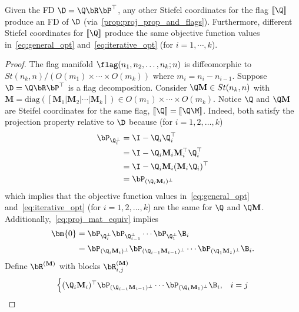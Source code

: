\begin{prop}
    Given the FD $\D = \Q \bR \bP^\top$, any other Stiefel coordinates for the flag $[\![\Q]\!]$ produce an FD of $\D$ (via~\cref{prop:proj_prop_and_flags}). Furthermore, different Stiefel coordinates for $[\![\Q]\!]$ produce the same objective function values in~\cref{eq:general_opt} and~\cref{eq:iterative_opt} (for $i=1,\cdots,k$).
\end{prop}
\begin{proof}
    The flag manifold $\flag(n_1,n_2,\dots,n_k;n)$ is diffeomorphic to $St(n_k,n)/(O(m_1)\times \cdots \times O(m_k))$ where $m_i = n_i - n_{i-1}$. Suppose $\D = \Q \bR \bP^\top$ is a flag decomposition. Consider $\Q \mathbf{M} \in St(n_k,n)$ with $\mathbf{M} = \mathrm{diag}([\mathbf{M}_1|\mathbf{M}_2|\cdots | \mathbf{M}_k]) \in O(m_1)\times \cdots \times O(m_k)$. Notice $\Q$ and $\Q \mathbf{M}$ are Steifel coordinates for the same flag, $[\![\Q]\!]=[\![\Q\M]\!]$. Indeed, both satisfy the projection property relative to $\D$ because (for $i=1,2,\dots,k$)
    \begin{align}\label{eq:proj_mat_equiv}
    \begin{aligned}%
        \bP_{\Q_i^\perp} &= \I - \Q_i \Q_i^\top\\
        &= \I - \Q_i \mathbf{M}_i \mathbf{M}_i^\top\Q_i^\top\\
        &= \I - \Q_i \mathbf{M}_i (\mathbf{M}_i \Q_i)^\top\\
        &= \bP_{(\Q_i\mathbf{M}_i)^\perp}
    \end{aligned}
    \end{align}
    which implies that the objective function values in~\cref{eq:general_opt} and~\cref{eq:iterative_opt} (for $i=1,2,\dots,k$) are the same for $\Q$ and $\Q\mathbf{M}$. Additionally,~\cref{eq:proj_mat_equiv} implies
    \begin{align}
        \bm{0} &=\bP_{\Q_i^\perp}\bP_{\Q_{i-1}^\perp}\cdots \bP_{\Q_1^\perp} \B_i \\
        &= \bP_{(\Q_i\mathbf{M}_i)^\perp}\bP_{(\Q_{i-1}\mathbf{M}_{i-1})^\perp}\cdots \bP_{(\Q_1\mathbf{M}_1)^\perp} \B_i.
    \end{align}
    Define $\bR^{(\mathbf{M})}$ with blocks $\bR^{(\mathbf{M})}_{i,j}$
    \begin{equation}
        \begin{cases}
            (\Q_i\mathbf{M}_i)^\top\bP_{(\Q_{i-1}\mathbf{M}_{i-1})^\perp}\cdots \bP_{(\Q_1\mathbf{M}_1)^\perp} \B_i, &i=j\\

\end{cases}
\end{equation}
\end{proof}

